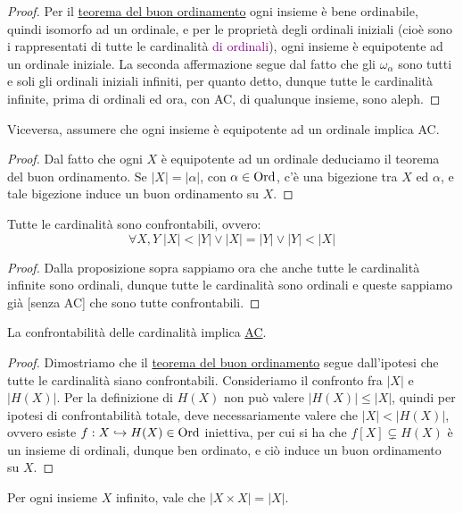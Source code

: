 \begin{proof}
	Per il \hyperref[buon_ordinamento]{teorema del buon ordinamento} ogni insieme è bene ordinabile, quindi isomorfo ad un ordinale, e per le proprietà
	degli ordinali iniziali (cioè sono i rappresentati di tutte le cardinalità \textcolor{purple}{di ordinali}), ogni insieme è equipotente ad un ordinale iniziale.
	La seconda affermazione segue dal fatto che gli $\omega_\alpha$ sono tutti e soli gli ordinali iniziali infiniti, per quanto detto, dunque tutte le cardinalità infinite, prima di ordinali ed ora,
	con AC, di qualunque insieme, sono aleph.
\end{proof}

\begin{remark}
	Viceversa, assumere che ogni insieme è equipotente ad un ordinale implica AC.
\end{remark}

\begin{proof}
	Dal fatto che ogni $X$ è equipotente ad un ordinale deduciamo il teorema del buon ordinamento. Se $|X| = |\alpha|$, con $\alpha \in \operatorname{Ord}$, c'è una bigezione tra $X$ ed $\alpha$, e tale bigezione induce un buon ordinamento su $X$.
\end{proof}

\begin{corollary}
	Tutte le cardinalità sono confrontabili, ovvero:
	\[ \forall X,Y \; |X| < |Y| \lor |X| = |Y| \lor |Y| < |X|
		\]
\end{corollary}

\begin{proof}
	Dalla proposizione sopra sappiamo ora che anche tutte le cardinalità infinite sono ordinali, dunque tutte le cardinalità sono ordinali e queste sappiamo già [senza AC] che sono tutte confrontabili.
\end{proof}

\begin{remark}
	La confrontabilità delle cardinalità implica \hyperref[ax9]{AC}.
\end{remark}

\begin{proof}
	Dimostriamo che il \hyperref[buon_ordinamento]{teorema del buon ordinamento} segue dall'ipotesi che tutte le cardinalità siano confrontabili. Consideriamo il confronto fra $|X|$ e $|H(X)|$.
	Per la definizione di $H(X)$ non può valere $|H(X)| \leq |X|$, quindi per ipotesi di confrontabilità totale, deve necessariamente valere che $|X| < |H(X)|$, ovvero esiste $f : X \hookrightarrow H(X) \in \operatorname{Ord}$ iniettiva,
	per cui si ha che $f[X] \subsetneq H(X)$ è un insieme di ordinali, dunque ben ordinato, e ciò induce un buon ordinamento su $X$.
\end{proof}
\pagebreak
\begin{corollary}[AC $\implies |X \times X| = |X|$]
	Per ogni insieme $X$ infinito, vale che $|X \times X| = |X|$.
\end{corollary}

